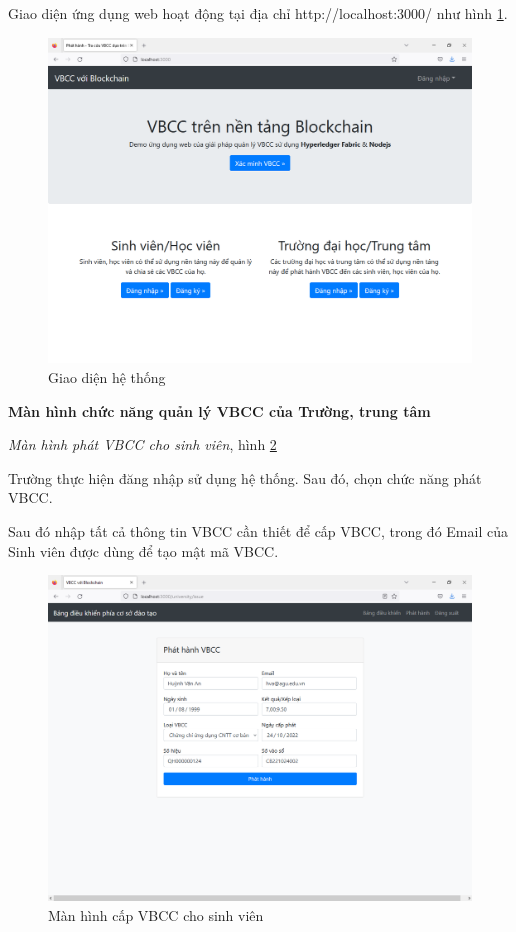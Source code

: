 Giao diện ứng dụng web hoạt động tại địa chỉ http://localhost:3000/ như hình \ref{fig:main_vbcc}. 

\begin{figure}[H]
\centering
\includegraphics[width=.9\linewidth]{img/main_vbcc.png}
\caption{Giao diện hệ thống}
\label{fig:main_vbcc}
\end{figure}

\textbf{Màn hình chức năng quản lý VBCC của Trường, trung tâm}

\emph{Màn hình phát VBCC cho sinh viên}, hình \ref{fig:tt_phathanh}

Trường thực hiện đăng nhập sử dụng hệ thống. Sau đó, chọn chức năng phát VBCC. 

Sau đó nhập tất cả thông tin VBCC cần thiết để cấp VBCC, trong đó Email của Sinh viên được dùng để tạo mật mã VBCC.
\begin{figure}[H]
\centering
\includegraphics[width=.9\linewidth]{img/tt_phathanh.PNG}
\caption{Màn hình cấp VBCC cho sinh viên}
\label{fig:tt_phathanh}
\end{figure}

